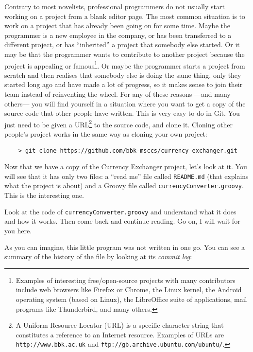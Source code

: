 Contrary to most novelists, professional programmers do not usually
start working on a project from a blank editor page. 
The most common situation is to work
on a project that has already been going on for some time. Maybe the
programmer is a new employee in the company, or has been transferred
to a different project, or has ``inherited'' a project that somebody
else started. Or it may be that the programmer wants to contribute to
another project because the project is appealing or
famous\footnote{Examples of interesting free/open-source projects with
  many contributors include web browsers like Firefox or Chrome, the
  Linux kernel, the Android operating system (based on Linux), the
  LibreOffice suite of applications, mail programs 
  like Thunderbird, and many others.}. Or maybe the programmer starts a
project from scratch and then realises that somebody else is doing the
same thing, only they started long ago and have made a lot of
progress, so it makes sense to join their team instead of reinventing
the wheel. For any of these reasons ---and many others--- you will
find yourself in a situation where you want to get a copy of the
source code that other people have written. This is very easy to do in
Git. You just need to be given a URL\footnote{A Uniform
  Resource Locator (URL) is a specific character string that
  constitutes a reference to an Internet resource. Examples of URLs
  are \texttt{http://www.bbk.ac.uk} and
  \texttt{ftp://gb.archive.ubuntu.com/ubuntu/}.
} to the source code, and clone it. Cloning other people's project
works in the same way as cloning your own project: 

\begin{verbatim}
    > git clone https://github.com/bbk-msccs/currency-exchanger.git
\end{verbatim}

Now that we have a copy of the Currency Exchanger project, let's look
at it. You will see that it has only two files: a ``read me'' file
called \verb+README.md+ (that explains what the project is about) and
a Groovy file called \verb+currencyConverter.groovy+. This is the
interesting one. 

Look at the code of \verb+currencyConverter.groovy+ and understand
what it does and how it works. Then come back and continue reading. Go
on, I will wait for you here. 

As you can imagine, this little program was not written in one go. You
can see a summary of the history of the file by looking at its
\emph{commit log}: 

